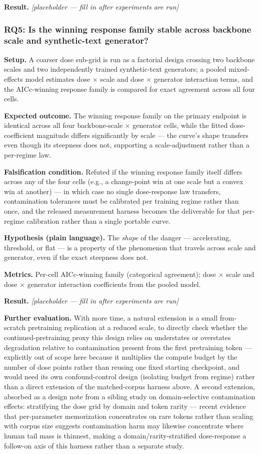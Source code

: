 \documentclass[11pt]{article}
\newcommand{\ph}{\textit{[placeholder --- fill in after experiments are run]}}
\begin{document}
\textbf{Result.} \ph

\subsubsection{RQ5: Is the winning response family stable across backbone scale and synthetic-text generator?}
\textbf{Setup.} A coarser dose sub-grid is run as a factorial design crossing two backbone scales and two independently trained synthetic-text generators; a pooled mixed-effects model estimates dose $\times$ scale and dose $\times$ generator interaction terms, and the AICc-winning response family is compared for exact agreement across all four cells.

\textbf{Expected outcome.} The winning response family on the primary endpoint is identical across all four backbone-scale $\times$ generator cells, while the fitted dose-coefficient magnitude differs significantly by scale --- the curve's shape transfers even though its steepness does not, supporting a scale-adjustment rather than a per-regime law.

\textbf{Falsification condition.} Refuted if the winning response family itself differs across any of the four cells (e.g., a change-point win at one scale but a convex win at another) --- in which case no single dose-response law transfers, contamination tolerances must be calibrated per training regime rather than once, and the released measurement harness becomes the deliverable for that per-regime calibration rather than a single portable curve.

\textbf{Hypothesis (plain language).} The \emph{shape} of the danger --- accelerating, threshold, or flat --- is a property of the phenomenon that travels across scale and generator, even if the exact steepness does not.

\textbf{Metrics.} Per-cell AICc-winning family (categorical agreement); dose $\times$ scale and dose $\times$ generator interaction coefficients from the pooled model.

\textbf{Result.} \ph

\vspace{0.5em}
\noindent\textbf{Further evaluation.} With more time, a natural extension is a small from-scratch pretraining replication at a reduced scale, to directly check whether the continued-pretraining proxy this design relies on understates or overstates degradation relative to contamination present from the first pretraining token --- explicitly out of scope here because it multiplies the compute budget by the number of dose points rather than reusing one fixed starting checkpoint, and would need its own confound-control design (isolating budget from regime) rather than a direct extension of the matched-corpus harness above. A second extension, absorbed as a design note from a sibling study on domain-selective contamination effects: stratifying the dose grid by domain and token rarity --- recent evidence that per-parameter memorization concentrates on rare tokens rather than scaling with corpus size suggests contamination harm may likewise concentrate where human tail mass is thinnest, making a domain/rarity-stratified dose-response a follow-on axis of this harness rather than a separate study.
\end{document}
